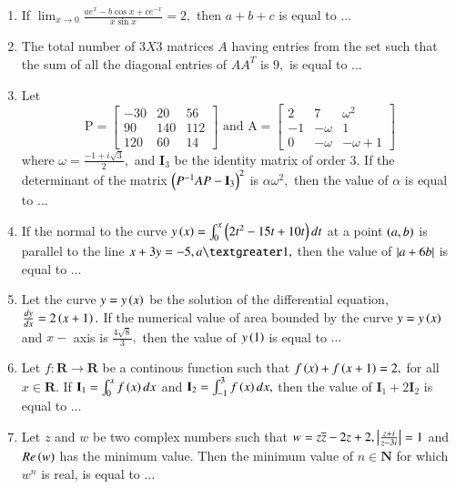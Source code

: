 \documentclass[journal,12pt,twocolumn]{IEEEtran}
\theoremstyle{remark}
\begin{document}
\begin{enumerate}[start=16]
    \item If $\lim_{x \to 0}\frac{ae^x-b\cos x+ce^{-x}}{x\sin x}=2,$ then $a+b+c$ is equal to $\dots$\\
    \item The total number of $3 X 3$ matrices $A$ having entries from the set  such that the sum of all the diagonal entries of $AA^T$ is $9,$ is equal to $\dots$\\
    \item Let $$\text{P} = \begin{bmatrix}
-30 & 20  & 56 \\
90  & 140 & 112 \\
120 & 60  & 14
\end{bmatrix} \text{ and A} =
\begin{bmatrix}
2  & 7  & \omega^2 \\
-1 & -\omega & 1 \\
0  & -\omega & -\omega + 1
\end{bmatrix}$$ where $\omega =\frac{-1+i\sqrt{3}}{2},$ and $\textbf{I}_3$ be the identity matrix of order $3.$ If the determinant of the matrix $\left(P^{-1}AP-\textbf{I}_3\right)^2$ is $\alpha\omega^2,$ then the value of $\alpha$ is equal to $\dots$\\
\item If the normal to the curve $y\left(x\right)=\int_0^x\left(2t^2-15t+10t\right)dt$ at a point $\left(a,b\right)$ is parallel to the line $x+3y=-5, a\textgreater 1,$ then the value of $\left\vert a+6b\right\vert$ is equal to $\dots$\\
\item Let the curve $y=y\left(x\right)$ be the solution of the differential equation, $\frac{dy}{dx}=2\left(x+1\right).$ If the numerical value of area bounded by the curve $y=y\left(x\right)$ and $x-$ axis is $\frac{4\sqrt{8}}{3},$ then the value of $y\left(1\right)$ is equal to $\dots$\\
\item Let $f : \textbf{R} \to \textbf{R}$ be a continous function such that $f\left(x\right)+f\left(x+1\right)=2,$ for all $x \in \textbf{R}.$ If $\textbf{I}_1=\int_0^xf\left(x\right)dx$ and $\textbf{I}_2=\int_{-1}^3f\left(x\right)dx,$ then the value of $\textbf{I}_1 +2\textbf{I}_2$ is equal to $\dots$\\
\item Let $z$ and $w$ be two complex numbers such that $w=z\overline{z}-2z+2, \left\vert\frac{z+i}{z-3i}\right\vert=1$ and $Re\left(w\right)$ has the minimum value. Then the minimum value of $n \in \textbf{N}$ for which $w^n$ is real, is equal to $\dots$
\end{enumerate}
\end{document}
